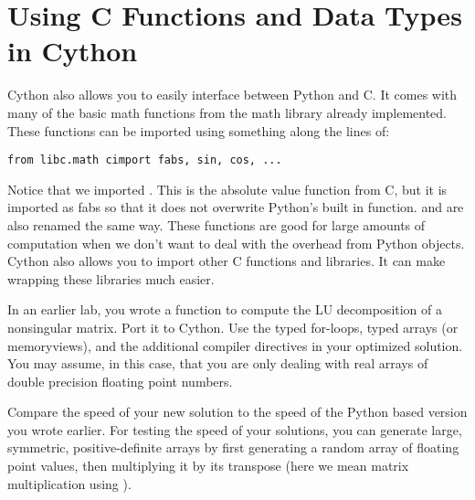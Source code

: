 \section*{Using C Functions and Data Types in Cython}
Cython also allows you to easily interface between Python and C.
It comes with many of the basic math functions from the math library already implemented.
These functions can be imported using something along the lines of:
\begin{lstlisting}
from libc.math cimport fabs, sin, cos, ...
\end{lstlisting}
Notice that we imported .
This is the absolute value function from C, but it is imported as fabs so that it does not overwrite Python's built in  function.
 and  are also renamed the same way.
These functions are good for large amounts of computation when we don't want to deal with the overhead from Python objects.
Cython also allows you to import other C functions and libraries.
It can make wrapping these libraries much easier.

\begin{problem}
In an earlier lab, you wrote a function to compute the LU decomposition of a nonsingular matrix.
Port it to Cython.
Use the typed for-loops, typed arrays (or memoryviews), and the additional compiler directives in your optimized solution.
You may assume, in this case, that you are only dealing with real arrays of double precision floating point numbers.

Compare the speed of your new solution to the speed of the Python based version you wrote earlier.
For testing the speed of your solutions, you can generate large, symmetric, positive-definite arrays by first generating a random array of floating point values, then multiplying it by its transpose (here we mean matrix multiplication using ).
\end{problem}


